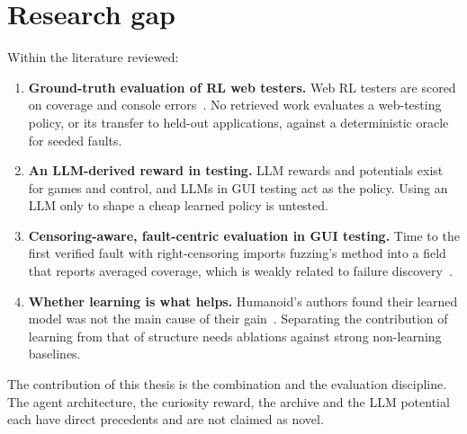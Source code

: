 \section{Research gap}
\label{sec:bg-gap}

Within the literature reviewed:

\begin{enumerate}
  \item \textbf{Ground-truth evaluation of RL web testers.} Web RL testers are scored on
        coverage and console errors~\cite{zheng2021webexplor, gu2025webrled}. No retrieved work evaluates a web-testing policy, or
        its transfer to held-out applications, against a deterministic oracle for seeded
        faults.
  \item \textbf{An LLM-derived reward in testing.} LLM rewards and potentials exist for games
        and control, and LLMs in GUI testing act as
        the policy. Using an LLM
        only to shape a cheap learned policy is untested.
  \item \textbf{Censoring-aware, fault-centric evaluation in GUI testing.} Time to the first
        verified fault with right-censoring imports fuzzing's method into a field that
        reports averaged coverage, which is weakly related to failure
        discovery~\cite{liu2026webgui}.
  \item \textbf{Whether learning is what helps.} Humanoid's authors found their learned model
        was not the main cause of their gain~\cite{li2019humanoid}. Separating the
        contribution of learning from that of structure needs ablations against strong
        non-learning baselines.
\end{enumerate}

The contribution of this thesis is the combination and the evaluation discipline. The agent
architecture, the curiosity reward, the archive and the LLM potential each have direct
precedents and are not claimed as novel.
